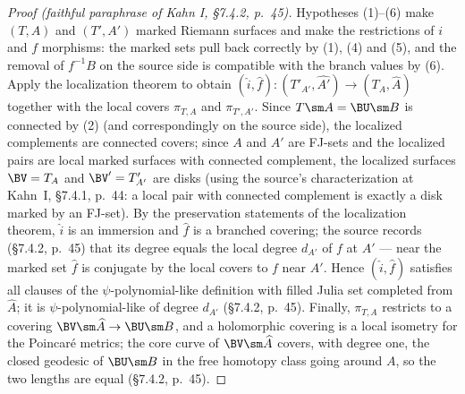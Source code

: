 \begin{proof}[Proof (faithful paraphrase of Kahn I, \S7.4.2, p.~45)]
Hypotheses (1)--(6) make \((T,A)\) and \((T',A')\) marked Riemann
surfaces and make the restrictions of \(i\) and \(f\) morphisms: the
marked sets pull back correctly by (1), (4) and (5), and the removal
of \(f^{-1}B\) on the source side is compatible with the branch values
by (6).  Apply the localization theorem to obtain
\((\widehat i,\widehat f)\colon(T'_{A'},\widehat{A'})\to(T_A,\widehat A)\)
together with the local covers \(\pi_{T,A}\) and \(\pi_{T',A'}\).
Since \(T\sm A=\BU\sm B\) is connected by (2) (and correspondingly on
the source side), the localized complements are connected covers;
since \(A\) and \(A'\) are FJ-sets and the localized pairs are local
marked surfaces with connected complement, the localized surfaces
\(\BV=T_A\) and \(\BV'=T'_{A'}\) are disks (using the source's
characterization at Kahn~I, \S7.4.1, p.~44: a local pair with connected
complement is exactly a disk marked by an FJ-set).  By the
preservation statements of the localization theorem, \(\widehat i\) is
an immersion and \(\widehat f\) is a branched covering; the source
records (\S7.4.2, p.~45) that its degree equals the local degree
\(d_{A'}\) of \(f\) at \(A'\) --- near the marked set \(\widehat f\)
is conjugate by the local covers to \(f\) near \(A'\).  Hence
\((\widehat i,\widehat f)\) satisfies all clauses of the
\(\psi\)-polynomial-like definition with filled Julia set completed
from \(\widehat A\); it is \(\psi\)-polynomial-like of degree
\(d_{A'}\) (\S7.4.2, p.~45).  Finally, \(\pi_{T,A}\) restricts to a
covering \(\BV\sm\widehat A\to\BU\sm B\), and a holomorphic covering
is a local isometry for the Poincar\'e metrics; the core curve of
\(\BV\sm\widehat A\) covers, with degree one, the closed geodesic of
\(\BU\sm B\) in the free homotopy class going around \(A\), so the two
lengths are equal (\S7.4.2, p.~45).
\end{proof}